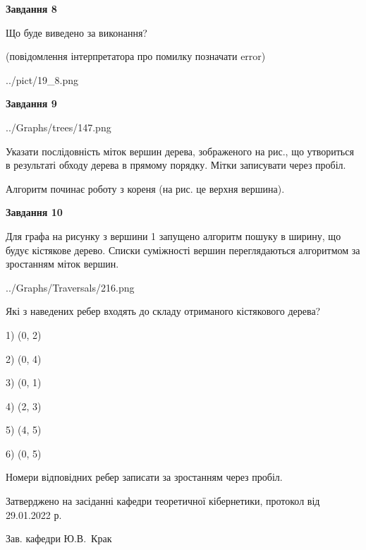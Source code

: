 \documentclass[12pt, ukrainian]{article}
\begin{document}
{\begin {large}
{\begin {center}\textbf{Завдання 8}\end {center}}\par
Що буде виведено за виконання?\par
 (повідомлення інтерпретатора про помилку позначати error)\par
\begin{center}
	{../pict/19_8.png}
\end{center}
\newpage

{\begin {center}\textbf{Завдання 9}\end {center}}\par

\begin{center}
	{../Graphs/trees/147.png}
\end{center}
Указати послідовність міток вершин дерева, зображеного на рис., що утвориться в результаті обходу дерева в прямому порядку. Мітки записувати через пробіл.\par Алгоритм починає роботу з кореня (на рис. це верхня вершина).\par
\newpage

{\begin {center}\textbf{Завдання 10}\end {center}}\par
Для графа на рисунку з вершини 1 запущено алгоритм пошуку в ширину, що будує кістякове дерево. Списки суміжності вершин переглядаються алгоритмом за зростанням міток вершин.\par
\begin{center}
	{../Graphs/Traversals/216.png}
\end{center}
\par Які з наведених ребер входять до складу отриманого кістякового дерева?\par
1) (0, 2)\par
2) (0, 4)\par
3) (0, 1)\par
4) (2, 3)\par
5) (4, 5)\par
6) (0, 5)\par
{\vskip 15pt} Номери відповідних ребер записати за зростанням через пробіл.\par
\newpage


\end {large}
}
{\smallskip \begin {small} Затверджено на засіданні кафедри теоретичної кібернетики, протокол  від   29.01.2022 р.\par\smallskip\smallskip
{\parbox {6.5 cm}{Зав. кафедри \dotfill Ю.В.~Крак}} \end{small}}
\end{document}
